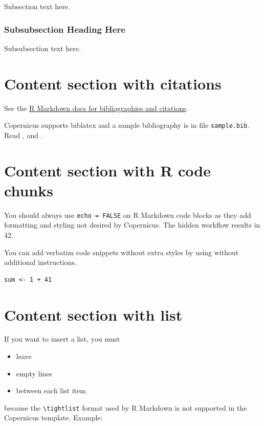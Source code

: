 \documentclass[ACP, manuscript]{copernicus}
\begin{document}
Subsection text here.

\subsubsection{Subsubsection Heading Here}

Subsubsection text here.

\section{Content section with citations}

See the
\href{http://rmarkdown.rstudio.com/authoring_bibliographies_and_citations.html}{R
Markdown docs for bibliographies and citations}.

Copernicus supports biblatex and a sample bibliography is in file
\texttt{sample.bib}. Read \citep{Feynman1963118}, and
\citep[see][]{Dirac1953888}.

\section{Content section with R code chunks}

You should always use \texttt{echo\ =\ FALSE} on R Markdown code blocks
as they add formatting and styling not desired by Copernicus. The hidden
workflow results in 42.

You can add verbatim code snippets without extra styles by using
\texttt{\textasciigrave{}\textasciigrave{}\textasciigrave{}} without
additional instructions.

\begin{verbatim}
sum <- 1 + 41
\end{verbatim}

\section{Content section with list}

If you want to insert a list, you must

\begin{itemize}
\item
  leave
\item
  empty lines
\item
  between each list item
\end{itemize}

because the \texttt{\textbackslash{}tightlist} format used by R Markdown
is not supported in the Copernicus template. Example:
\end{document}
